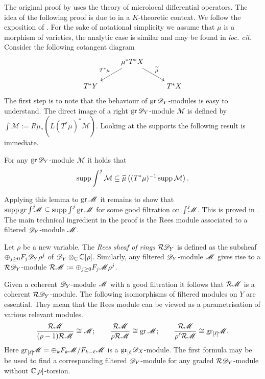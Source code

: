 The original proof by \cite{kashiwara1976b} uses the theory of microlocal differential operators.
The idea of the following proof is due to \cite{malgrange1985images} in a $K$-theoretic context.
We follow the exposition of \cite{sabbah2011introduction}.
For the sake of notational simplicity we assume that $\mu$ is a morphism of varieties, the analytic case is similar and may be found in {\it loc. cit.}
\\

Consider the following cotangent diagram
$$
\begin{tikzcd}
    & \mu^* T^* X \arrow[swap]{ld}{T^* \mu} \arrow{rd}{\widetilde{\mu}} & \\
    T^* Y & & T^*X
\end{tikzcd}
$$
The first step is to note that the behaviour of $\operatorname{gr} \mathscr{D}_Y$-modules is easy to understand.
The direct image of a right $\operatorname{gr} \mathscr{D}_Y$-module $\mathcal{M}$ is defined by $\int \mathcal{M} :=  R\widetilde{\mu}_* ( L(T^*\mu)^*\mathcal{M}).$
Looking at the supports the following result is immediate.
\begin{lemma}\label{lem: GrKashiwara}
    For any $\operatorname{gr}\mathscr{D}_Y$-module $\mathcal{M}$ it holds that
    $$\operatorname{supp} \int^j \mathcal{M}\subseteq \widetilde{\mu}\left((T^* \mu)^{-1} \operatorname{supp} \mathcal{M}\right).$$
\end{lemma}
Applying this lemma to $\operatorname{gr}\mathscr{M}$ it remains to show that $\operatorname{supp}\operatorname{gr}\int^j \mkern -8mu\mathscr{M}\subseteq \operatorname{supp}\int^j \operatorname{gr}\mathscr{M}$ for some good filtration on $\int^j \mkern -8mu\mathscr{M}$.
This is proved in .
The main technical ingredient in the proof is the Rees module associated to a filtered $\mathscr{D}_Y$-module $\mathscr{M}$.
\begin{definition}
    Let $\rho$ be a new variable. The {\it Rees sheaf of rings} $\mathcal{R}\mathscr{D}_Y$ is defined as the subsheaf $\oplus_{j\geq 0} F_j \mathscr{D}_Y \rho^j $ of $\mathscr{D}_Y \otimes_{\mathbb{C}} \mathbb{C}[\rho]$.
    Similarly, any filtered $\mathscr{D}_Y$-module $\mathscr{M}$ gives rise to a $\mathcal{R}\mathscr{D}_Y$-module $\mathcal{R}\mathscr{M} := \oplus_{j\geq 0} F_j \mathscr{M} \rho^j$.
\end{definition}
Given a coherent $\mathscr{D}_Y$-module $\mathscr{M}$ with a good filtration it follows that $\mathcal{R}\mathscr{M}$ is a coherent $\mathcal{R}\mathscr{D}_Y$-module.%
The following isomorphisms of filtered modules on $Y$ are essential.
They mean that the Rees module can be viewed as a parametrisation of various relevant modules.
$$\frac{\mathcal{R}\mathscr{M}}{(\rho-1)\mathcal{R}\mathscr{M}} \cong \mathscr{M}; \qquad \frac{\mathcal{R}\mathscr{M}}{\rho\mathcal{R}\mathscr{M}} \cong \operatorname{gr} \mathscr{M};\qquad \frac{\mathcal{R}\mathscr{M}}{\rho^\ell\mathcal{R}\mathscr{M}} \cong  \operatorname{gr}_{[\ell]}\mkern-5mu\mathscr{M}.$$
Here $\operatorname{gr}_{[\ell]}\mkern-5mu\mathscr{M} = \oplus_k F_{k}\mathscr{M}/F_{k-\ell}\mathscr{M}$ is a $\operatorname{gr}_{[\ell]}\mkern-5mu \mathscr{D}_X$-module.
The first formula may be be used to find a corresponding filtered $\mathscr{D}_Y$-module for any graded $\mathcal{R}\mathscr{D}_Y$-module without $\mathbb{C}[\rho]$-torsion.

